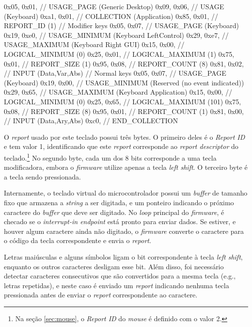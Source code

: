 \documentclass[brazil,pagestart=firstchapter]{abnt}
\makeatletter
\newcommand*{\eg}{e.g.\@\xspace}
\makeatother
\begin{document}
\begin{ccode}[numbers=none, float=h, label={lst:report_keyboard},
	caption={\textit{Report descriptor} do teclado USB}
]
	0x05, 0x01,        // USAGE_PAGE (Generic Desktop)
	0x09, 0x06,        // USAGE (Keyboard)
	0xa1, 0x01,        // COLLECTION (Application)
	0x85, 0x01,	       //   REPORT_ID (1)
	// Modifier keys
	0x05, 0x07,        //   USAGE_PAGE (Keyboard)
	0x19, 0xe0,        //   USAGE_MINIMUM (Keyboard LeftControl)
	0x29, 0xe7,        //   USAGE_MAXIMUM (Keyboard Right GUI)
	0x15, 0x00,        //   LOGICAL_MINIMUM (0)
	0x25, 0x01,        //   LOGICAL_MAXIMUM (1)
	0x75, 0x01,        //   REPORT_SIZE (1)
	0x95, 0x08,        //   REPORT_COUNT (8)
	0x81, 0x02,        //   INPUT (Data,Var,Abs)
	// Normal keys
	0x05, 0x07,        //   USAGE_PAGE (Keyboard)
	0x19, 0x00,        //   USAGE_MINIMUM (Reserved (no event indicated))
	0x29, 0x65,        //   USAGE_MAXIMUM (Keyboard Application)
	0x15, 0x00,        //   LOGICAL_MINIMUM (0)
	0x25, 0x65,        //   LOGICAL_MAXIMUM (101)
	0x75, 0x08,        //   REPORT_SIZE (8)
	0x95, 0x01,        //   REPORT_COUNT (1)
	0x81, 0x00,        //   INPUT (Data,Ary,Abs)
	0xc0,              // END_COLLECTION
\end{ccode}

O \textit{report} usado por este teclado possui três bytes. O primeiro deles
é o \textit{Report ID} e tem valor 1, identificando que este \textit{report}
corresponde ao \textit{report descriptor} do teclado.\footnote{
	Na seção \ref{sec:mouse}, o \textit{Report ID} do \textit{mouse} é
	definido com o valor 2.
} No segundo byte, cada um dos 8 bits corresponde a uma tecla modificadora,
embora o \textit{firmware} utilize apenas a tecla \textit{left shift}. O
terceiro byte é a tecla sendo pressionada.

Internamente, o teclado virtual do microcontrolador possui um
\textit{buffer} de tamanho fixo que armazena a \textit{string} a ser
digitada, e um ponteiro indicando o próximo caractere do \textit{buffer} que
deve ser digitado. No \textit{loop} principal do \textit{firmware}, é
checado se o \textit{interrupt-in endpoint} está pronto para enviar dados.
Se estiver, e houver algum caractere ainda não digitado, o \textit{firmware}
converte o caractere para o código da tecla correspondente e envia o
\textit{report}.

Letras maiúsculas e alguns símbolos ligam o bit correspondente à tecla
\textit{left shift}, enquanto os outros caracteres desligam esse bit. Além
disso, foi necessário detectar caracteres consecutivos que são convertidos
para a mesma tecla (\eg, letras repetidas), e neste caso é enviado um
\textit{report} indicando nenhuma tecla pressionada antes de enviar o
\textit{report} correspondente ao caractere.
\end{document}
